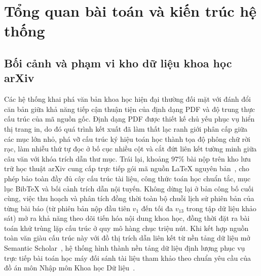 \section{Tổng quan bài toán và kiến trúc hệ thống}

\subsection{Bối cảnh và phạm vi kho dữ liệu khoa học arXiv}

Các hệ thống khai phá văn bản khoa học hiện đại thường đối mặt với đánh đổi căn bản giữa khả năng tiếp cận thuận tiện của định dạng PDF và độ trung thực cấu trúc của mã nguồn gốc. Định dạng PDF được thiết kế chủ yếu phục vụ hiển thị trang in, do đó quá trình kết xuất đã làm thất lạc ranh giới phân cấp giữa các mục lớn nhỏ, phá vỡ cấu trúc ký hiệu toán học thành tọa độ phông chữ rời rạc, làm nhiễu thứ tự đọc ở bố cục nhiều cột và cắt đứt liên kết tường minh giữa câu văn với khóa trích dẫn thư mục. Trái lại, khoảng $97\%$ bài nộp trên kho lưu trữ học thuật arXiv cung cấp trực tiếp gói mã nguồn LaTeX nguyên bản~\cite{ginev2024}, cho phép bảo toàn đầy đủ cây cấu trúc tài liệu, công thức toán học chuẩn tắc, mục lục BibTeX và bối cảnh trích dẫn nội tuyến. Không dừng lại ở bản công bố cuối cùng, việc thu hoạch và phân tích đồng thời toàn bộ chuỗi lịch sử phiên bản của từng bài báo (từ phiên bản nộp đầu tiên $v_1$ đến tối đa $v_{13}$ trong tập dữ liệu khảo sát) mở ra khả năng theo dõi tiến hóa nội dung khoa học, đồng thời đặt ra bài toán khử trùng lặp cấu trúc ở quy mô hàng chục triệu nút. Khi kết hợp nguồn toàn văn giàu cấu trúc này với đồ thị trích dẫn liên kết từ nền tảng dữ liệu mở Semantic Scholar~\cite{kinney2023}, hệ thống hình thành nền tảng dữ liệu định lượng phục vụ trực tiếp bài toán học máy đối sánh tài liệu tham khảo theo chuẩn yêu cầu của đồ án môn Nhập môn Khoa học Dữ liệu~\cite{hcmus_intro_ds}.

